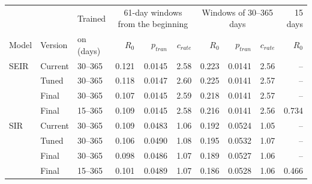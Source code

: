 \begin{tabular}{lllrrrrrrr}
\toprule
 &  & Trained & \multicolumn{3}{c}{61-day windows from the beginning} & \multicolumn{3}{c}{Windows of 30--365 days} & 15 days \\
\cmidrule(lr){4-6}\cmidrule(lr){7-9}\cmidrule(lr){10-10}
Model & Version & on (days) & $R_0$ & $p_{tran}$ & $c_{rate}$ & $R_0$ & $p_{tran}$ & $c_{rate}$ & $R_0$ \\
\midrule
SEIR & Current & 30--365 & 0.121 & 0.0145 & 2.58 & 0.223 & 0.0141 & 2.56 & -- \\
 & Tuned & 30--365 & 0.118 & 0.0147 & 2.60 & 0.225 & 0.0141 & 2.57 & -- \\
 & Final & 30--365 & 0.107 & 0.0145 & 2.59 & 0.218 & 0.0141 & 2.57 & -- \\
 & Final & 15--365 & 0.109 & 0.0145 & 2.58 & 0.216 & 0.0141 & 2.56 & 0.734 \\
\midrule
SIR & Current & 30--365 & 0.109 & 0.0483 & 1.06 & 0.192 & 0.0524 & 1.05 & -- \\
 & Tuned & 30--365 & 0.106 & 0.0490 & 1.08 & 0.195 & 0.0532 & 1.07 & -- \\
 & Final & 30--365 & 0.098 & 0.0486 & 1.07 & 0.189 & 0.0527 & 1.06 & -- \\
 & Final & 15--365 & 0.101 & 0.0489 & 1.07 & 0.186 & 0.0528 & 1.06 & 0.466 \\
\bottomrule
\end{tabular}
